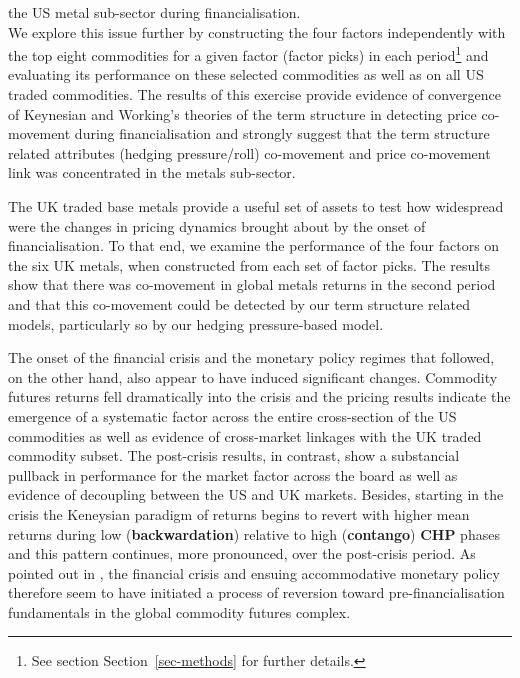 \documentclass[
  authoryear,
  preprint,
  3p]{elsarticle}
\begin{document}
the US metal sub-sector during financialisation.\\
We explore this issue further by constructing the four factors
independently with the top eight commodities for a given factor (factor
picks) in each period\footnote{See section Section~\ref{sec-methods} for
  further details.} and evaluating its performance on these selected
commodities as well as on all US traded commodities. The results of this
exercise provide evidence of convergence of Keynesian and Working's
theories of the term structure in detecting price co-movement during
financialisation and strongly suggest that the term structure related
attributes (hedging pressure/roll) co-movement and price co-movement
link was concentrated in the metals sub-sector.

\medskip

The UK traded base metals provide a useful set of assets to test how
widespread were the changes in pricing dynamics brought about by the
onset of financialisation. To that end, we examine the performance of
the four factors on the six UK metals, when constructed from each set of
factor picks. The results show that there was co-movement in global
metals returns in the second period and that this co-movement could be
detected by our term structure related models, particularly so by our
hedging pressure-based model.

\medskip

The onset of the financial crisis and the monetary policy regimes that
followed, on the other hand, also appear to have induced significant
changes. Commodity futures returns fell dramatically into the crisis and
the pricing results indicate the emergence of a systematic factor across
the entire cross-section of the US commodities as well as evidence of
cross-market linkages with the UK traded commodity subset. The
post-crisis results, in contrast, show a substancial pullback in
performance for the market factor across the board as well as evidence
of decoupling between the US and UK markets. Besides, starting in the
crisis the Keneysian paradigm of returns begins to revert with higher
mean returns during low (\textbf{backwardation}) relative to high
(\textbf{contango}) \textbf{CHP} phases and this pattern continues, more
pronounced, over the post-crisis period. As pointed out in
\citet{basu_definancialisation}, the financial crisis and ensuing
accommodative monetary policy therefore seem to have initiated a process
of reversion toward pre-financialisation fundamentals in the global
commodity futures complex.
\end{document}
